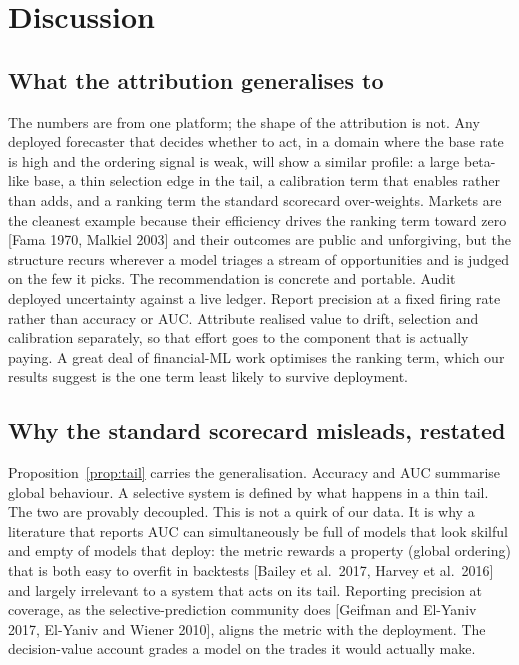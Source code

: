 \documentclass[10pt,a4paper,oneside]{article}
\theoremstyle{definition}
\theoremstyle{plain}
\begin{document}
\section{Discussion}
\label{sec:discussion}
\subsection{What the attribution generalises to}
The numbers are from one platform; the shape of the attribution is not. Any deployed
forecaster that decides whether to act, in a domain where the base rate is high and
the ordering signal is weak, will show a similar profile: a large beta-like base, a
thin selection edge in the tail, a calibration term that enables rather than adds, and
a ranking term the standard scorecard over-weights. Markets are the cleanest example
because their efficiency drives the ranking term toward zero [Fama 1970,
Malkiel 2003] and their outcomes are public and unforgiving, but the structure recurs
wherever a model triages a stream of opportunities and is judged on the few it picks.
The recommendation is concrete and portable. Audit deployed uncertainty against a live
ledger. Report precision at a fixed firing rate rather than accuracy or AUC. Attribute
realised value to drift, selection and calibration separately, so that effort goes to
the component that is actually paying. A great deal of financial-ML work optimises the
ranking term, which our results suggest is the one term least likely to survive
deployment.

\subsection{Why the standard scorecard misleads, restated}
Proposition~\ref{prop:tail} carries the generalisation. Accuracy and AUC summarise
global behaviour. A selective system is defined by what happens in a thin tail. The two
are provably decoupled. This is not a quirk of our data. It is why a
literature that reports AUC can simultaneously be full of models that look skilful and
empty of models that deploy: the metric rewards a property (global ordering) that is
both easy to overfit in backtests [Bailey et al.\ 2017, Harvey et al.\ 2016] and
largely irrelevant to a system that acts on its tail. Reporting precision at coverage,
as the selective-prediction community does [Geifman and El-Yaniv 2017,
El-Yaniv and Wiener 2010], aligns the metric with the deployment. The decision-value
account grades a model on the trades it would actually make.
\end{document}
